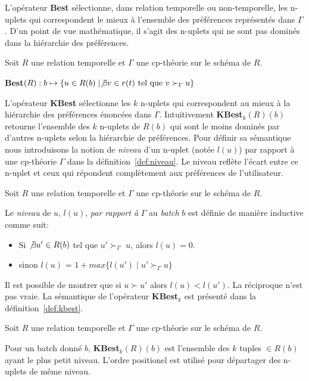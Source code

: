 L'opérateur \textbf{Best} sélectionne, dans relation temporelle ou non-temporelle, les n-uplets qui correspondent le mieux à l'ensemble des préférences représentés dans $\Gamma$. D'un point de vue mathématique, il s'agit des n-uplets qui ne sont pas dominés dans la hiérarchie des préférences.

\begin{defi}[Best]\label{def:best}
Soit $R$ une relation temporelle et $\Gamma$ une cp-th\'eorie sur le schéma de $R$. 

\textbf{Best}$(R): b\mapsto \{u \in R(b) \mid \not\exists v \in r(t) \textrm{ tel que } v \succ_\Gamma u \}$
\end{defi}

L'opérateur \textbf{KBest} sélectionne les $k$ n-uplets qui correspondent au mieux à la hiérarchie des préférences énoncées dans $\Gamma$. Intuitivement \textbf{KBest}$_k(R)(b)$ retourne l'ensemble des $k$ n-uplets de $R(b)$ qui sont le moins dominés par d'autres n-uplets selon la hiérarchie de préférences. Pour définir sa sémantique nous introduisons la notion de \textit{niveau} d'un n-uplet (notée $l(u)$) par rapport à une cp-théorie $\Gamma$ dans la définition~\ref{def:niveau}. Le niveau reflète l'écart entre ce n-uplet et ceux qui répondent complètement aux préférences de l'utilisateur.

\begin{defi}[Niveau]\label{def:niveau}
Soit $R$ une relation temporelle et $\Gamma$ une cp-th\'eorie sur le schéma de $R$.

Le \textit{niveau} de $u$, $l(u)$, \textit{par rapport à} $\Gamma$ au \textit{batch} $b$ est définie de manière inductive comme suit:
 \begin{itemize}
 \item Si $\not\exists u' \in R(b)$ tel que $u' \succ_\Gamma$ $u$, alors $l(u) = 0$.
 \item sinon $l(u)$ = $1+max \{l(u') \mid u' \succ_\Gamma u\} $
 \end{itemize}
\end{defi}

Il est possible de montrer que si $u \succ u'$ alors $l(u) < l(u')$. La réciproque n'est pas vraie. La sémantique de l'opérateur \textbf{KBest}$_k$ est présenté dans la définition~\ref{def:kbest}.

\begin{defi}[KBest]\label{def:kbest}
Soit $R$ une relation temporelle et $\Gamma$ une cp-th\'eorie sur le schéma de $R$. 

Pour un batch donné $b$, \textbf{KBest}$_k(R)(b)$ est l'ensemble des $k$ tuples $\in R(b)$ ayant le plus petit niveau. L'ordre positionel est utilisé pour départager des n-uplets de même niveau.
\end{defi}

